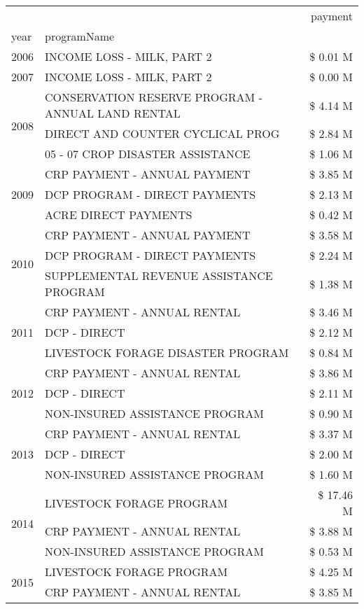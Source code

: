 \begin{tabular}{llr}
\toprule
 &  & payment \\
year & programName &  \\
\midrule
2006 & INCOME LOSS - MILK, PART 2 & \$ 0.01 M \\
\cline{1-3}
2007 & INCOME LOSS - MILK, PART 2 & \$ 0.00 M \\
\cline{1-3}
\multirow[t]{3}{*}{2008} & CONSERVATION RESERVE PROGRAM - ANNUAL LAND RENTAL & \$ 4.14 M \\
 & DIRECT AND COUNTER CYCLICAL PROG & \$ 2.84 M \\
 & 05 - 07 CROP DISASTER ASSISTANCE & \$ 1.06 M \\
\cline{1-3}
\multirow[t]{3}{*}{2009} & CRP PAYMENT - ANNUAL PAYMENT & \$ 3.85 M \\
 & DCP PROGRAM - DIRECT PAYMENTS & \$ 2.13 M \\
 & ACRE DIRECT PAYMENTS & \$ 0.42 M \\
\cline{1-3}
\multirow[t]{3}{*}{2010} & CRP PAYMENT - ANNUAL PAYMENT & \$ 3.58 M \\
 & DCP PROGRAM - DIRECT PAYMENTS & \$ 2.24 M \\
 & SUPPLEMENTAL REVENUE ASSISTANCE PROGRAM & \$ 1.38 M \\
\cline{1-3}
\multirow[t]{3}{*}{2011} & CRP PAYMENT - ANNUAL RENTAL & \$ 3.46 M \\
 & DCP - DIRECT & \$ 2.12 M \\
 & LIVESTOCK FORAGE DISASTER PROGRAM & \$ 0.84 M \\
\cline{1-3}
\multirow[t]{3}{*}{2012} & CRP PAYMENT - ANNUAL RENTAL & \$ 3.86 M \\
 & DCP - DIRECT & \$ 2.11 M \\
 & NON-INSURED ASSISTANCE PROGRAM & \$ 0.90 M \\
\cline{1-3}
\multirow[t]{3}{*}{2013} & CRP PAYMENT - ANNUAL RENTAL & \$ 3.37 M \\
 & DCP - DIRECT & \$ 2.00 M \\
 & NON-INSURED ASSISTANCE PROGRAM & \$ 1.60 M \\
\cline{1-3}
\multirow[t]{3}{*}{2014} & LIVESTOCK FORAGE PROGRAM & \$ 17.46 M \\
 & CRP PAYMENT - ANNUAL RENTAL & \$ 3.88 M \\
 & NON-INSURED ASSISTANCE PROGRAM & \$ 0.53 M \\
\cline{1-3}
\multirow[t]{3}{*}{2015} & LIVESTOCK FORAGE PROGRAM & \$ 4.25 M \\
 & CRP PAYMENT - ANNUAL RENTAL & \$ 3.85 M \\

\end{tabular}
